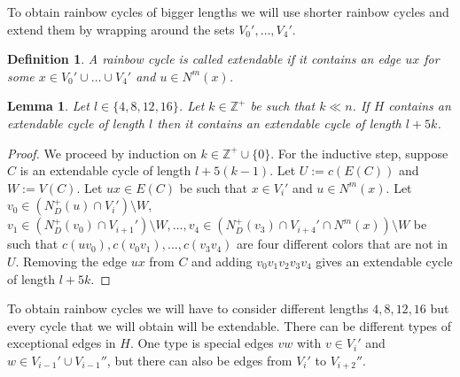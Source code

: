 \documentclass{article}
\newtheorem{defn}[theorem]{Definition}
\newtheorem{fact}[theorem]{Fact}
\newtheorem{lemma}[theorem]{Lemma}
\begin{document}
%
To obtain rainbow cycles of bigger lengths we will use shorter rainbow cycles and extend them by wrapping around the sets $V_0',\dots, V_4'$.

\begin{defn}\label{extendable-def}A rainbow cycle is called {\it extendable} if it contains an edge $ux$ for some $x\in V_0'\cup \dots \cup V_4'$ and $u\in N^m(x)$.
\end{defn}
\begin{lemma}Let $l\in \{4,8,12,16\}$. Let $k\in \mathbb{Z}^+$  be such that $k\ll n$. If $H$  contains an extendable cycle of length $l$ then it contains an extendable cycle of length $l+5k$.
\end{lemma}
\begin{proof}We proceed by induction on $k\in \mathbb{Z}^+\cup \{0\}$. For the inductive step, suppose $C$ is an extendable cycle of length $l+5(k-1)$. Let $U:= c(E(C))$ and $W:=V(C)$.  Let $ux\in E(C)$ be such that $x\in V_i'$ and $u\in N^m(x)$. Let $v_0\in (N^+_D(u)\cap V_i')\setminus W$, $v_1\in (N^+_D(v_0) \cap V_{i+1}')\setminus W, \dots, v_4\in (N^+_D(v_3)\cap V_{i+4}'\cap N^m(x))\setminus W$ be such that $c(uv_0),c(v_0v_1),\dots, c(v_3v_4)$ are four different colors that are not in $U$. Removing the edge $ux$ from $C$ and adding $v_0v_1v_2v_3v_4$ gives an extendable cycle of length ${l+5k}$. 
\end{proof}
To obtain rainbow cycles we will have to consider different lengths $4,8,12,16$ but every cycle that we will obtain will be extendable.
There can be different types of exceptional edges in $H$. One type is special edges $vw$ with $v\in V_{i}'$ and $w\in V_{i-1}'\cup V_{i-1}''$, but there can also be edges from $V_i'$ to $V_{i+2}''$.
\end{document}
